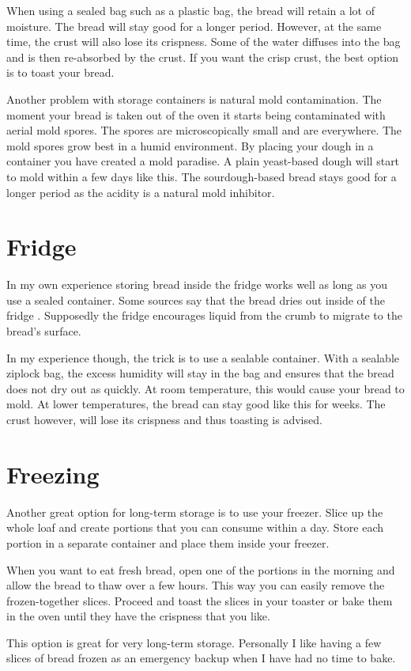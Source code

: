 When using a sealed bag such as a plastic bag, the bread
will retain a lot of moisture. The bread will stay good
for a longer period. However, at the same time, the crust
will also lose its crispness. Some of the water diffuses
into the bag and is then re-absorbed by the crust. If
you want the crisp crust, the best option is to toast your
bread.

Another problem with storage containers is natural
mold contamination. The moment your bread is taken out of
the oven it starts being contaminated with aerial mold spores.
The spores are microscopically small and are everywhere.
The mold spores grow best in a humid environment. By placing
your dough in a container you have created a mold paradise.
A plain yeast-based dough will start to mold within a few days
like this. The sourdough-based bread stays good
for a longer period as the acidity is a natural mold
inhibitor.

\section{Fridge}

In my own experience storing bread inside the fridge
works well as long as you use a sealed container. Some
sources say that the bread dries out inside of the
fridge \cite{storing+bread}. Supposedly the fridge
encourages liquid from the crumb to migrate to the bread's surface.

In my experience though, the trick is to use a sealable
container. With a sealable ziplock bag,
the excess humidity will stay in the bag and ensures
that the bread does not dry out as quickly. At room
temperature, this would cause your bread to mold. At
lower temperatures, the bread can stay good like this for
weeks. The crust however, will lose its crispness and
thus toasting is advised.

\section{Freezing}

Another great option for long-term storage is to use
your freezer. Slice up the whole loaf and create portions
that you can consume within a day. Store each portion
in a separate container and place them inside your
freezer.

When you want to eat fresh bread, open one of the portions
in the morning and allow the bread to thaw over a few
hours. This way you can easily remove the frozen-together
slices. Proceed and toast the slices in your toaster
or bake them in the oven until they have the crispness
that you like.

This option is great for very long-term storage. Personally
I like having a few slices of bread frozen as an emergency
backup when I have had no time to bake.
